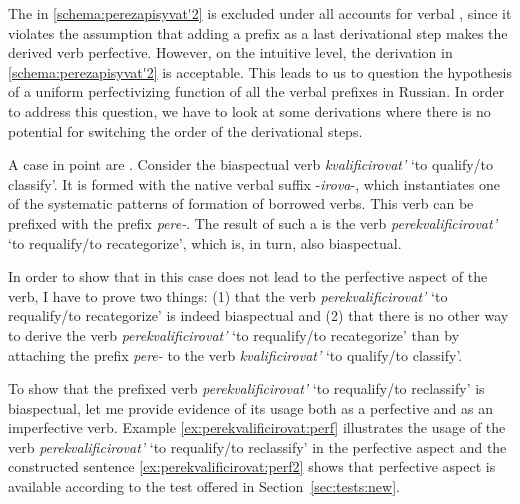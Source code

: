 The  in \ref{schema:perezapisyvat'2} is excluded under all accounts for verbal , since it violates the assumption that adding a prefix as a last derivational step makes the derived verb perfective. However, on the intuitive level, the derivation in \ref{schema:perezapisyvat'2} is acceptable. This leads to us to question the hypothesis of a uniform perfectivizing function of all the verbal prefixes in Russian. In order to address this question, we have to look at some derivations where there is no potential for switching the order of the derivational steps.

A case in point are . Consider the biaspectual verb \textit{kvalificirovat'} `to qualify/to classify'. It is formed with the native verbal suffix -\textit{irova}-, which instantiates one of the systematic patterns of formation of borrowed verbs. This verb can be prefixed with the  prefix \textit{pere-}. The result of such a  is the verb \textit{perekvalificirovat'} `to requalify/to recategorize', which is, in turn, also biaspectual.

In order to show that in this case  does not lead to the perfective aspect of the verb, I have to prove two things: (1) that the verb \textit{perekvalificirovat'} `to requalify/to recategorize' is indeed biaspectual and (2) that there is no other way to derive the verb \textit{perekvalificirovat'} `to requalify/to recategorize' than by attaching the prefix \textit{pere-} to the verb \textit{kvalificirovat'} `to qualify/to classify'.

To show that the prefixed verb \textit{perekvalificirovat'} `to requalify/to reclassify' is  biaspectual, let me provide evidence of its usage both as a perfective and as an imperfective verb. Example \ref{ex:perekvalificirovat:perf} illustrates the usage of the verb \textit{perekvalificirovat'} `to requalify/to reclassify' in the perfective aspect and the constructed sentence \ref{ex:perekvalificirovat:perf2} shows that perfective aspect is available according to the test offered in Section~\ref{sec:tests:new}.

